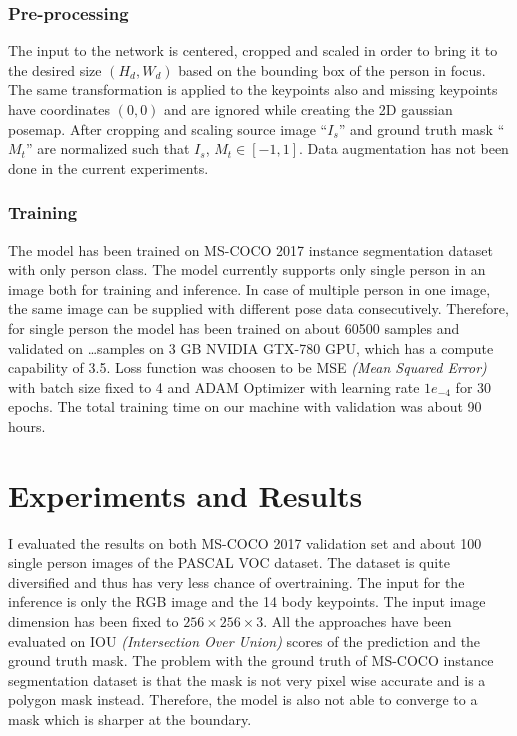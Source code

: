 \documentclass[conference]{IEEEtran}
\begin{document}
\subsubsection{Pre-processing}
The input to the network is centered, cropped and scaled in order to bring it to the desired size $(H_{d},W_{d})$ based on the bounding box of the person in focus. The same transformation is applied to the keypoints also and missing keypoints have coordinates $(0,0)$ and are ignored while creating the 2D gaussian posemap. After cropping and scaling source image ``$I_{s}$'' and ground truth mask ``$M_{t}$'' are normalized such that $I_{s}$, $M_{t} \in [-1,1]$. Data augmentation has not been done in the current experiments.

\subsubsection{Training}
The model has been trained on MS-COCO 2017 instance segmentation dataset with only person class. The model currently supports only single person in an image both for training and inference. In case of multiple person in one image, the same image can be supplied with different pose data consecutively. Therefore, for single person the model has been trained on about 60500 samples and validated on \ldots samples on 3 GB NVIDIA GTX-780 GPU, which has a compute capability of 3.5. Loss function was choosen to be MSE \textit{(Mean Squared Error)} with batch size fixed to 4 and ADAM Optimizer with learning rate $1e_{-4}$ for 30 epochs. The total training time on our machine with validation was about 90 hours. 

\section{Experiments and Results}
I evaluated the results on both MS-COCO 2017 validation set and about 100 single person images of the PASCAL VOC dataset. The dataset is quite diversified and thus has very less chance of overtraining. The input for the inference is only the RGB image and the 14 body keypoints. The input image dimension has been fixed to $256 \times 256 \times 3$. All the approaches have been evaluated on IOU \textit{(Intersection Over Union)} scores of the prediction and the ground truth mask. The problem with the ground truth of MS-COCO instance segmentation dataset is that the mask is not very pixel wise accurate and is a polygon mask instead. Therefore, the model is also not able to converge to a mask which is sharper at the boundary.
\end{document}
